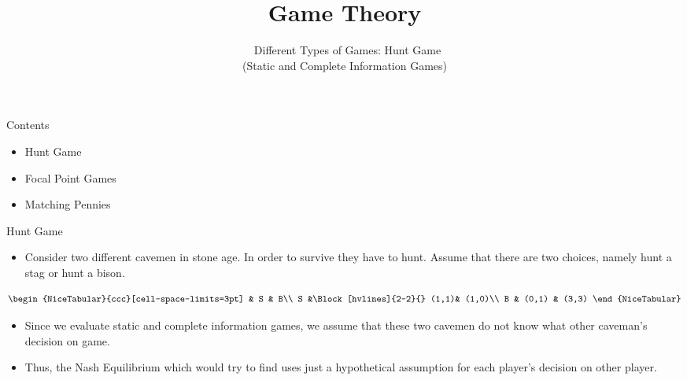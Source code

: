 \documentclass[
  ignorenonframetext,
]{beamer}
\title{Game Theory}
\subtitle{~Different Types of Games: Hunt Game\\
\hspace*{0.333em}\hspace*{0.333em}(Static and Complete Information
Games)}
\author{}
\date{\vspace{-2.5em}}
\begin{document}
\frame{\titlepage}

\begin{frame}{Contents}
\protect\hypertarget{contents}{}
\begin{itemize}
  \item Hunt Game
  \item Focal Point Games
  \item Matching Pennies
\end{itemize}
\end{frame}

\begin{frame}{Hunt Game}
\protect\hypertarget{hunt-game}{}
\begin{itemize}
  \item Consider two different cavemen in stone age. In order to survive they have to hunt. Assume that there are two choices, namely hunt a stag or hunt a bison.
\end{itemize}

\[\begin{NiceTabular}{ccc}[cell-space-limits=3pt] & S & B\\
S &\Block[hvlines]{2-2}{} (1,1)& (1,0)\\
B & (0,1) & (3,3) \end{NiceTabular}\]

\begin{itemize}
  \item Since we evaluate static and complete information games, we assume that these two cavemen do not know what other caveman's decision on game. 
  \item Thus, the Nash Equilibrium which would try to find uses just a hypothetical assumption for each player's decision on other player.
\end{itemize}
\end{frame}
\end{document}
